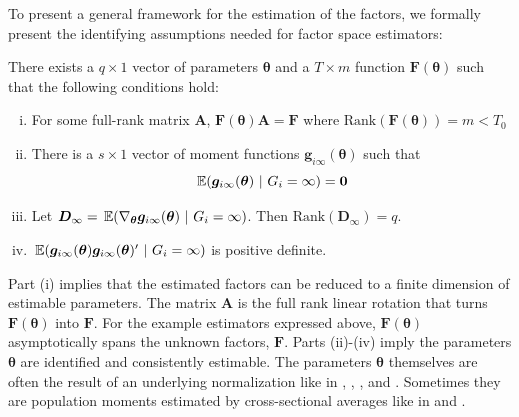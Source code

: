 \documentclass[12pt]{article}
\begin{document}
To present a general framework for the estimation of the factors, we formally present the identifying assumptions needed for factor space estimators:
\begin{assumption}\label{asm:factor_identification}
  There exists a $q \times 1$ vector of parameters $\bm{\theta}$ and a $T \times m$ function $\bm{F}(\bm{\theta})$ such that the following conditions hold:
  \begin{enumerate}[(i)]
    \item For some full-rank matrix $\bm{A}$, $\bm{F}(\bm{\theta}) \bm{A} = \bm{F}$ where $\text{Rank}(\bm{F}(\bm{\theta})) = m < T_0$ 
    \item There is a $s \times 1$ vector of moment functions $\bm g_{i\infty}(\bm{\theta})$ such that 
    \begin{equation}\label{eq:factor_moments}
      \expec{\bm g_{i\infty}(\bm{\theta})}{G_i = \infty} = \bm 0
    \end{equation}
    
    \item Let $\bm D_{\infty} = \expec{\nabla_{\bm{\theta}} \bm g_{i \infty}(\bm{\theta})}{G_i = \infty}$. Then $\text{Rank}(\bm D_{\infty}) = q$.
    \item $\expec{\bm g_{i \infty}(\bm{\theta}) \bm g_{i \infty}(\bm{\theta})'}{G_i = \infty}$ is positive definite. 
  \end{enumerate}
\end{assumption}
Part (i) implies that the estimated factors can be reduced to a finite dimension of estimable parameters. The matrix $\bm A$ is the full rank linear rotation that turns $\bm{F}(\bm{\theta})$ into $\bm{F}$. For the example estimators expressed above, $\bm{F}(\bm{\theta})$ asymptotically spans the unknown factors, $\bm{F}$. Parts (ii)-(iv) imply the parameters $\bm{\theta}$ are identified and consistently estimable. The parameters $\bm{\theta}$ themselves are often the result of an underlying normalization like in \citet{Bai_2009}, \citet{Ahn_Lee_Schmidt_2013}, \citet{Juodis_Sarafidis_2022}, and \citet{Callaway_Karami_2020}. Sometimes they are population moments estimated by cross-sectional averages like in \citet{Westerlund_Petrova_Norkute_2019} and \citet{Brown_Schmidt_Wooldridge2021}. 
\end{document}
